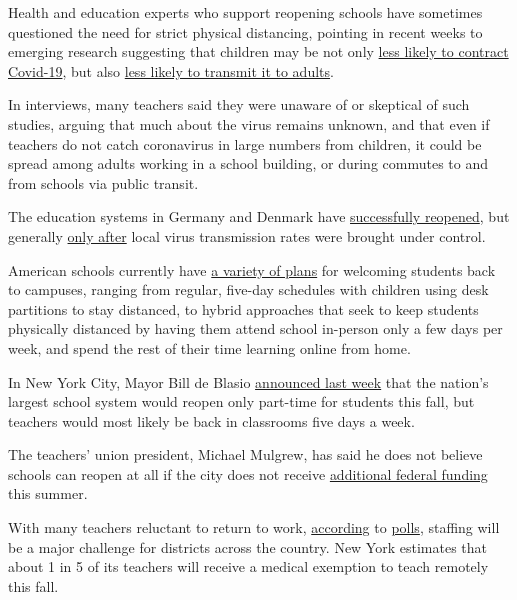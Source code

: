 Health and education experts who support reopening schools have
sometimes questioned the need for strict physical distancing, pointing
in recent weeks to emerging research suggesting that children may be not
only \href{https://pubmed.ncbi.nlm.nih.gov/32546824/}{less likely to
contract Covid-19}, but also
\href{https://pediatrics.aappublications.org/content/early/2020/07/08/peds.2020-004879}{less
likely to transmit it to adults}.

In interviews, many teachers said they were unaware of or skeptical of
such studies, arguing that much about the virus remains unknown, and
that even if teachers do not catch coronavirus in large numbers from
children, it could be spread among adults working in a school building,
or during commutes to and from schools via public transit.

The education systems in Germany and Denmark have
\href{https://www.nytimes3xbfgragh.onion/2020/05/10/world/europe/reopen-schools-germany.html}{successfully
reopened}, but generally
\href{https://www.sciencemag.org/news/2020/07/school-openings-across-globe-suggest-ways-keep-coronavirus-bay-despite-outbreaks}{only
after} local virus transmission rates were brought under control.

American schools currently have
\href{https://www.nytimes3xbfgragh.onion/2020/06/26/us/coronavirus-schools-reopen-fall.html}{a
variety of plans} for welcoming students back to campuses, ranging from
regular, five-day schedules with children using desk partitions to stay
distanced, to hybrid approaches that seek to keep students physically
distanced by having them attend school in-person only a few days per
week, and spend the rest of their time learning online from home.

In New York City, Mayor Bill de Blasio
\href{https://www.nytimes3xbfgragh.onion/2020/07/08/nyregion/nyc-schools-reopening-plan.html}{announced
last week} that the nation's largest school system would reopen only
part-time for students this
fall\href{https://www.nytimes3xbfgragh.onion/2020/07/08/nyregion/nyc-schools-reopening-plan.html}{,}
but teachers would most likely be back in classrooms five days a week.

The teachers' union president, Michael Mulgrew, has said he does not
believe schools can reopen at all if the city does not receive
\href{https://www.nytimes3xbfgragh.onion/2020/07/09/us/schools-reopen-fall.html}{additional
federal funding} this summer.

With many teachers reluctant to return to work,
\href{https://www.edweek.org/ew/articles/2020/06/03/most-educators-want-schools-to-stay-closed.html}{according}
to
\href{https://www.usatoday.com/story/news/education/2020/05/26/coronavirus-schools-teachers-poll-ipsos-parents-fall-online/5254729002/}{polls},
staffing will be a major challenge for districts across the country. New
York estimates that about 1 in 5 of its teachers will receive a medical
exemption to teach remotely this fall.

